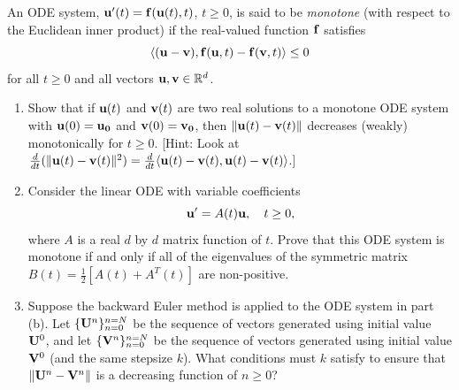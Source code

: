 \documentclass[10pt]{article}
\begin{document}
\maketitle



\begin{problem}[Problem 1]
An ODE system, \({\bf u}'(t) = {\bf f} ( {\bf u} (t),t)\), \(t \geq 0\), is said to be {\em monotone} (with respect to the Euclidean inner product) if the real-valued function \({\bf f}\) satisfies
\[
\langle ( {\bf u}- {\bf v}) , {\bf f}({\bf u},t) - {\bf f}({\bf v},t) \rangle \leq 0
\]
for all \(t \geq 0\) and all vectors \({\bf u} , {\bf v} \in \mathbb{R}^d\).

\begin{enumerate}[label=(\alph*)]
\item Show that if \({\bf u}(t)\) and \({\bf v}(t)\) are two real solutions to a monotone ODE system with \({\bf u}(0) = {\bf u_0}\) and \({\bf v}(0) = {\bf v_0}\), then \(\| {\bf u}(t) - {\bf v}(t) \|\) decreases (weakly) monotonically for \(t \geq 0\). [Hint:  Look at $\frac{d}{dt} ( \| {\bf u} (t) - {\bf v} (t) \|^2 ) = \frac{d}{dt} \langle {\bf u}(t) - {\bf v}(t) , {\bf u}(t) - {\bf v} (t) \rangle$.]

\item Consider the linear ODE with variable coefficients
\[
{\bf u}' = A(t) {\bf u} ,~~~t \geq 0 ,
\]
where \(A\) is a real \(d\) by \(d\) matrix function of \(t\).  Prove that this ODE system is monotone if and only if all of the eigenvalues of the symmetric matrix \(B(t) = \frac{1}{2} [A(t) + A^T (t) ]\) are non-positive.

\item Suppose the backward Euler method is applied to the ODE system in part (b).  Let \(\{ {\bf U}^n \}_{n=0}^{n=N}\) be the sequence of vectors generated using initial value \({\bf U}^0\), and let \(\{ {\bf V}^n \}_{n=0}^{n=N}\)
be the sequence of vectors generated using initial value \({\bf V}^0 \) (and the same stepsize \(k\)). What conditions must \(k\) satisfy to ensure that \(\| {\bf U}^n - {\bf V}^n \|\) is a decreasing function of \(n \geq 0\)?
\end{enumerate}
\end{problem}
\end{document}
